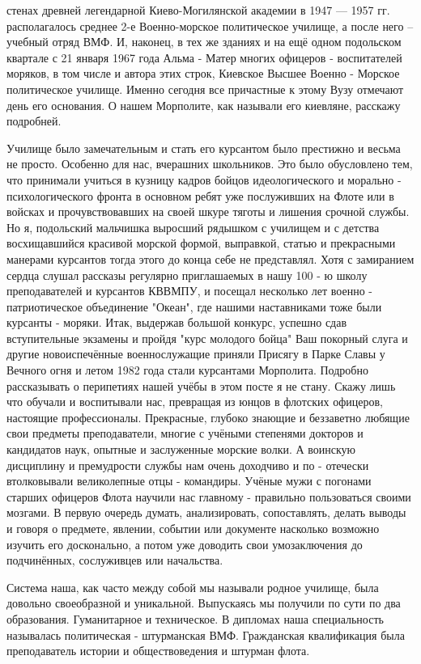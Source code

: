 стенах древней
легендарной Киево-Могилянской академии в 1947 — 1957 гг. располагалось
среднее 2-е Военно-морское политическое училище, а после него – учебный отряд
ВМФ. И, наконец, в тех же зданиях и на ещё одном подольском квартале с 21
января 1967 года Альма - Матер многих офицеров - воспитателей моряков, в том
числе и автора этих строк, Киевское Высшее Военно - Морское политическое
училище. Именно сегодня все причастные к этому Вузу отмечают день его
основания. О нашем Морполите, как называли его киевляне, расскажу подробней.

Училище было замечательным и стать его курсантом было престижно и весьма не
просто. Особенно для нас, вчерашних школьников. Это было обусловлено тем, что
принимали учиться в кузницу кадров бойцов идеологического и морально -
психологического фронта в основном ребят уже послуживших на Флоте или в войсках
и прочувствовавших на своей шкуре тяготы и лишения срочной службы. Но я,
подольский мальчишка выросший рядышком с училищем и с детства восхищавшийся
красивой морской формой, выправкой, статью и прекрасными манерами курсантов
тогда этого до конца себе не представлял. Хотя с замиранием сердца слушал
рассказы регулярно приглашаемых в нашу 100 - ю школу преподавателей и курсантов
КВВМПУ, и посещал несколько лет военно - патриотическое объединение "Океан",
где нашими наставниками тоже были курсанты - моряки. Итак, выдержав большой
конкурс, успешно сдав вступительные экзамены и пройдя "курс молодого бойца" Ваш
покорный слуга и другие новоиспечённые военнослужащие приняли Присягу в Парке
Славы у Вечного огня и летом 1982 года стали курсантами Морполита. Подробно
рассказывать о перипетиях нашей учёбы в этом посте я не стану. Скажу лишь что
обучали и воспитывали нас, превращая из юнцов в флотских офицеров, настоящие
профессионалы. Прекрасные, глубоко знающие и беззаветно любящие свои предметы
преподаватели, многие с учёными степенями докторов и кандидатов наук, опытные и
заслуженные морские волки. А воинскую дисциплину и премудрости службы нам очень
доходчиво и по - отечески втолковывали великолепные отцы - командиры. Учёные
мужи с погонами старших офицеров Флота научили нас главному - правильно
пользоваться своими мозгами. В первую очередь думать, анализировать,
сопоставлять, делать выводы и говоря о предмете, явлении, событии или документе
насколько возможно изучить его досконально, а потом уже доводить свои
умозаключения до подчинённых, сослуживцев или начальства. 

Система наша, как
часто между собой мы называли родное училище, была довольно своеобразной и
уникальной. Выпускаясь мы получили по сути по два образования. Гуманитарное и
техническое. В дипломах наша специальность называлась политическая -
штурманская ВМФ. Гражданская квалификация была преподаватель истории и
обществоведения и штурман флота. 

